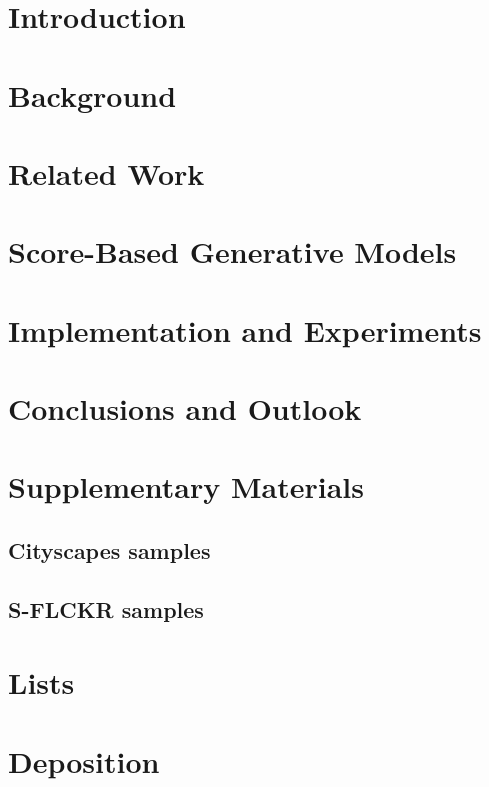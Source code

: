 \documentclass[a4paper, 12pt, oneside, BCOR=0cm]{scrbook}
\begin{document}
\mainmatter
\chapter{Introduction}


\chapter{Background}





\chapter{Related Work}



\chapter{Score-Based Generative Models} %





\chapter{Implementation and Experiments} \label{chap:5}



\chapter{Conclusions and Outlook} %
\appendix 
\chapter{Supplementary Materials}
\section{Cityscapes samples}
\section{S-FLCKR samples}

\chapter{Lists}
\listoffigures
\listoftables

\listofalgorithms



\chapter{Deposition}

\end{document}
